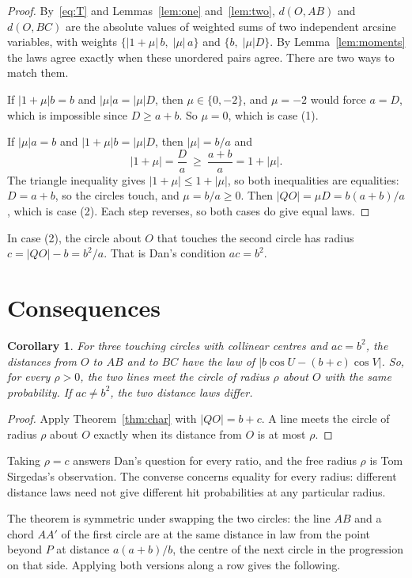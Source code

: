 \documentclass[11pt]{amsart}
\newtheorem{corollary}[theorem]{Corollary}
\theoremstyle{remark}
\begin{document}
\begin{proof}
By~\eqref{eq:T} and Lemmas~\ref{lem:one} and~\ref{lem:two}, $d(O,AB)$ and $d(O,BC)$ are the absolute values of weighted sums of two independent arcsine variables, with weights $\{|1+\mu|\,b,\;|\mu|\,a\}$ and $\{b,\;|\mu|D\}$. By Lemma~\ref{lem:moments} the laws agree exactly when these unordered pairs agree. There are two ways to match them.

If $|1+\mu|b=b$ and $|\mu|a=|\mu|D$, then $\mu\in\{0,-2\}$, and $\mu=-2$ would force $a=D$, which is impossible since $D\ge a+b$. So $\mu=0$, which is case (1).

If $|\mu|a=b$ and $|1+\mu|b=|\mu|D$, then $|\mu|=b/a$ and
\[
|1+\mu|=\frac{D}{a}\ \ge\ \frac{a+b}{a}=1+|\mu|.
\]
The triangle inequality gives $|1+\mu|\le1+|\mu|$, so both inequalities are equalities: $D=a+b$, so the circles touch, and $\mu=b/a\ge0$. Then $|QO|=\mu D=b(a+b)/a$, which is case (2). Each step reverses, so both cases do give equal laws.
\end{proof}

In case (2), the circle about $O$ that touches the second circle has radius $c=|QO|-b=b^2/a$. That is Dan's condition $ac=b^2$.

\section{Consequences}\label{sec:cons}

\begin{corollary}\label{cor:dan}
For three touching circles with collinear centres and $ac=b^2$, the distances from $O$ to $AB$ and to $BC$ have the law of $|b\cos U-(b+c)\cos V|$. So, for every $\rho>0$, the two lines meet the circle of radius $\rho$ about $O$ with the same probability. If $ac\ne b^2$, the two distance laws differ.
\end{corollary}

\begin{proof}
Apply Theorem~\ref{thm:char} with $|QO|=b+c$. A line meets the circle of radius $\rho$ about $O$ exactly when its distance from $O$ is at most $\rho$.
\end{proof}

Taking $\rho=c$ answers Dan's question for every ratio, and the free radius $\rho$ is Tom Sirgedas's observation. The converse concerns equality for every radius: different distance laws need not give different hit probabilities at any particular radius.

The theorem is symmetric under swapping the two circles: the line $AB$ and a chord $AA'$ of the first circle are at the same distance in law from the point beyond $P$ at distance $a(a+b)/b$, the centre of the next circle in the progression on that side. Applying both versions along a row gives the following.
\end{document}
